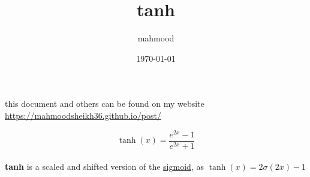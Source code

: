 \documentclass[a4paper,12pt]{article}
\author{mahmood}
\date{\today}
\title{tanh}
\begin{document}
\maketitle
\begin{note}
this document and others can be found on my website\\
\url{https://mahmoodsheikh36.github.io/post/}
\end{note}
\[
\tanh(x) = \frac{e^{2x}-1}{e^{2x}+1}
\]\\
\textbf{tanh} is a scaled and shifted version of the \href{20230503001218-sigmoid.org}{sigmoid}, as \(\tanh(x)=2\sigma(2x)-1\)
\end{document}
